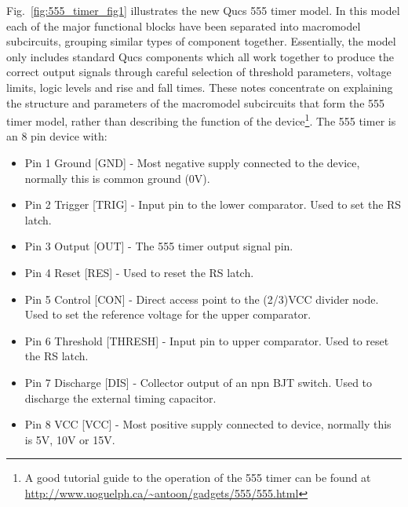 Fig.~\ref{fig:555_timer_fig1}  illustrates the new Qucs 555 timer model.  In this model each of the major functional blocks have been separated into macromodel subcircuits, grouping similar types of component together. Essentially, the model only includes standard Qucs components which all work together to produce the correct output signals through careful selection of threshold parameters, voltage limits, logic levels and rise and fall times.  These notes concentrate on explaining the structure and parameters of the macromodel subcircuits that form the 555 timer model, rather than describing the function of the device\footnote{A good tutorial guide to the operation of the 555 timer can be found at \url{http://www.uoguelph.ca/~antoon/gadgets/555/555.html}}. The 555 timer is an 8 pin device with:
\begin{itemize}
\item Pin 1 Ground    [GND]    - Most negative supply connected to the device, normally this is common ground (0V).
\item Pin 2 Trigger   [TRIG]   - Input pin to the lower comparator. Used to set the RS latch.
\item Pin 3 Output    [OUT]    - The 555 timer output signal pin.
\item Pin 4 Reset     [RES]    - Used to reset the RS latch.
\item Pin 5 Control   [CON]    - Direct access point to the (2/3)VCC divider node. Used to set the reference voltage for the upper comparator.
\item Pin 6 Threshold [THRESH] - Input pin to upper comparator. Used to reset the RS latch.
\item Pin 7 Discharge [DIS]    - Collector output of an npn BJT switch. Used to discharge the external timing capacitor.
\item Pin 8 VCC       [VCC]    - Most positive supply connected to device, normally this is 5V, 10V or 15V. 
\end{itemize}

\addvspace{12pt}

